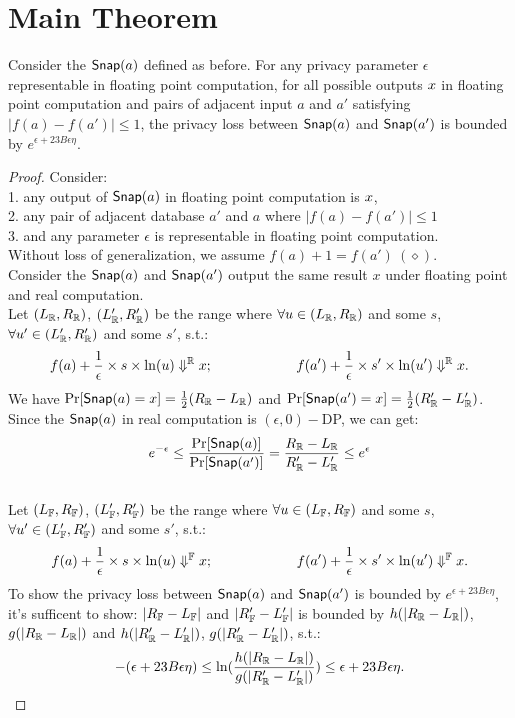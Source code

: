 \documentclass[a4paper,11pt]{article}
\begin{document}
\newpage
\section{Main Theorem}

\begin{thm}
%
Consider the $\mathsf{Snap}(a)$ defined as before. For any privacy parameter $\epsilon$ representable in floating point computation, for all possible outputs $x$ in floating point computation and pairs of adjacent input $a$ and $a'$ satisfying $|f(a) - f(a')| \leq 1$, the privacy loss between $\mathsf{Snap}(a)$ and $\mathsf{Snap}(a')$ is bounded by $e^{\epsilon + 23 B \epsilon \eta}$.
\end{thm}

\begin{proof}
%
%
Consider:
\\
1. any %
output of $\mathsf{Snap}(a)$ in floating point computation is $x$,
%
\\
2. any pair of adjacent database $a'$ and $a$ where $|f(a) - f(a')| \leq 1$
%
\\
3. and any parameter $\epsilon$ is representable in floating point computation.
%
\\
Without loss of generalization, we assume $f(a) + 1 = f(a') ~ (\diamond)$.
%
\\
%
Consider the $\mathsf{Snap}(a)$ and $\mathsf{Snap}(a')$ output the same result $x$ under floating point and real computation.
%
\\
%
Let $(L_{\mathbb{R}}, R_{\mathbb{R}})$, $(L_{\mathbb{R}}', R_{\mathbb{R}}')$ be the range where 
$\forall u \in (L_{\mathbb{R}}, R_{\mathbb{R}})$ and some $s$, 
$\forall u' \in (L_{\mathbb{R}}', R_{\mathbb{R}}')$ and some $s'$, s.t.:
%
$$f(a) + \frac{1}{\epsilon} \times s \times \ln (u) \Downarrow^{\mathbb{R}} x; 
~~~~~~~~~~~~~~~~~~
f(a') + \frac{1}{\epsilon} \times s' \times \ln (u') \Downarrow^{\mathbb{R}} x.$$
%
We have $\Pr[\mathsf{Snap}(a) = x] = \frac{1}{2} (R_{\mathbb{R}} - L_{\mathbb{R}})$ 
and $\Pr[\mathsf{Snap}(a') = x] = \frac{1}{2} (R_{\mathbb{R}}' - L_{\mathbb{R}}')$.
%
\\
%
Since the $\mathsf{Snap}(a)$ in real computation is $(\epsilon, 0)-$DP, we can get:
\[
	e^{-\epsilon} \leq \frac{\Pr[\mathsf{Snap}(a)]}{\Pr[\mathsf{Snap}(a')]}
	= \frac{R_{\mathbb{R}} - L_{\mathbb{R}}}{R_{\mathbb{R}}' - L_{\mathbb{R}}'} \leq e^{\epsilon}
\]
%
\\
%
Let $(L_{\mathbb{F}}, R_{\mathbb{F}})$, $(L_{\mathbb{F}}', R_{\mathbb{F}}')$ be the range where 
$\forall u \in (L_{\mathbb{F}}, R_{\mathbb{F}})$ and some $s$, 
$\forall u' \in (L_{\mathbb{F}}', R_{\mathbb{F}}')$ and some $s'$, s.t.:
%
$$f(a) + \frac{1}{\epsilon} \times s \times \ln (u) \Downarrow^{\mathbb{F}} x; 
~~~~~~~~~~~~~~~~~~
f(a') + \frac{1}{\epsilon} \times s' \times \ln (u') \Downarrow^{\mathbb{F}} x.$$
%
To show the privacy loss between $\mathsf{Snap}(a)$ and $\mathsf{Snap}(a')$ is bounded by $e^{\epsilon + 23 B \epsilon \eta}$, it’s sufficent to show:
%
%
$|R_{\mathbb{F}} - L_{\mathbb{F}}|$ and $|R_{\mathbb{F}}' - L_{\mathbb{F}}'|$
is bounded by $h(|{R_{\mathbb{R}}} - {L_{\mathbb{R}}}|)$, $g(|{R_{\mathbb{R}}} - {L_{\mathbb{R}}}|)$ and $h(|{R_{\mathbb{R}}'} - {L_{\mathbb{R}}'}|)$, $g(|{R_{\mathbb{R}}'} - {L_{\mathbb{R}}'}|)$,
%
s.t.:
%
\[
	-(\epsilon + 23 B \epsilon \eta)
	\leq \ln( \frac{h(|{R_{\mathbb{R}}} - {L_{\mathbb{R}}}|)}{g(|{R_{\mathbb{R}}'} - {L_{\mathbb{R}}'}|)} )
	\leq \epsilon + 23 B \epsilon \eta.
\]


\end{proof}
\end{document}
